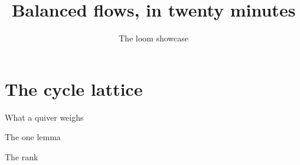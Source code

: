 \documentclass{beamer}
\title{Balanced flows, in twenty minutes}
\author{The loom showcase}
\begin{document}
\begin{frame}
\titlepage
\end{frame}

\section{The cycle lattice}\label{sh-0011}

\begin{frame}{What a quiver weighs}

\end{frame}

\begin{frame}{The one lemma}

\end{frame}

\begin{frame}{The rank}

\end{frame}
\end{document}
